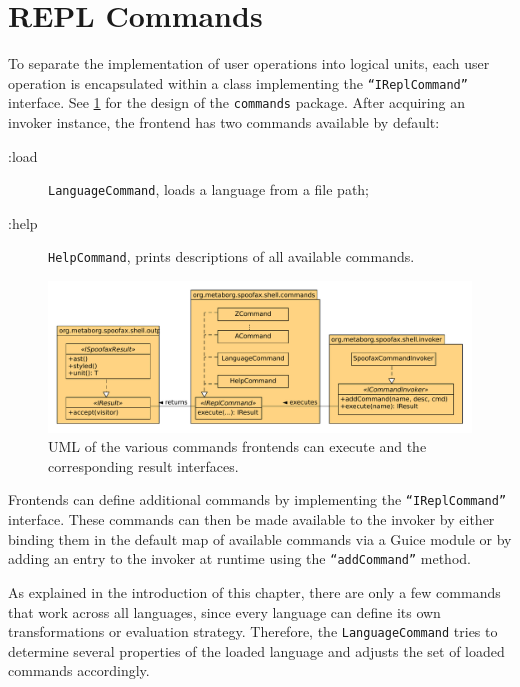 \section{REPL Commands}
\label{sec:commands}

To separate the implementation of user operations into logical units, each user
operation is encapsulated within a class implementing the
\texttt{``IReplCommand''} interface. See \cref{fig:uml-commands} for the design
of the \texttt{commands} package. After acquiring an invoker instance, the
frontend has two commands available by default:

\begin{description}
  \item [:load] \texttt{LanguageCommand}, loads a language from a file path;
  \item [:help] \texttt{HelpCommand}, prints descriptions of all available commands.
\end{description}

\begin{figure}[h]
  \centering
  \includegraphics[width=\textwidth]{uml-commands}
  \caption{UML of the various commands frontends can execute and the
           corresponding result interfaces.}
  \label{fig:uml-commands}
\end{figure}

Frontends can define additional commands by implementing the
\texttt{``IReplCommand''} interface. These commands can then be made available
to the invoker by either binding them in the default map of available commands
via a Guice module or by adding an entry to the invoker at runtime using the
\texttt{``addCommand''} method.

As explained in the introduction of this chapter, there are only a few
commands that work across all languages, since every language can define its
own transformations or evaluation strategy. Therefore, the
\texttt{LanguageCommand} tries to determine several properties of the loaded
language and adjusts the set of loaded commands accordingly.

